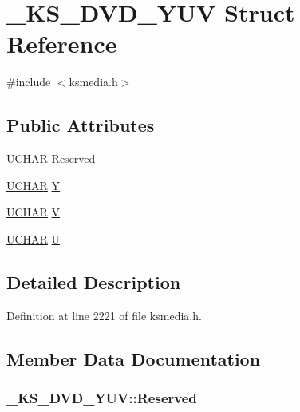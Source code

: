 \hypertarget{struct___k_s___d_v_d___y_u_v}{}\section{\+\_\+\+K\+S\+\_\+\+D\+V\+D\+\_\+\+Y\+UV Struct Reference}
\label{struct___k_s___d_v_d___y_u_v}


{\ttfamily \#include $<$ksmedia.\+h$>$}

\subsection*{Public Attributes}
\begin{DoxyCompactItemize}
\item 
\hyperlink{xlisp_8h_a9a1dc6d243c6f75bb42f87e3f69649e4}{U\+C\+H\+AR} \hyperlink{struct___k_s___d_v_d___y_u_v_ad2668a826fe951f2c968fff3d714551b}{Reserved}
\item 
\hyperlink{xlisp_8h_a9a1dc6d243c6f75bb42f87e3f69649e4}{U\+C\+H\+AR} \hyperlink{struct___k_s___d_v_d___y_u_v_a64e006d26034d45e0e8dd728c8193c58}{Y}
\item 
\hyperlink{xlisp_8h_a9a1dc6d243c6f75bb42f87e3f69649e4}{U\+C\+H\+AR} \hyperlink{struct___k_s___d_v_d___y_u_v_afe2aff1118fe00888a7b3e8ea3442caa}{V}
\item 
\hyperlink{xlisp_8h_a9a1dc6d243c6f75bb42f87e3f69649e4}{U\+C\+H\+AR} \hyperlink{struct___k_s___d_v_d___y_u_v_a8eaf7b9af2e7bbbabfbd37bd267b42bd}{U}
\end{DoxyCompactItemize}


\subsection{Detailed Description}


Definition at line 2221 of file ksmedia.\+h.



\subsection{Member Data Documentation}
\subsubsection[{\texorpdfstring{Reserved}{Reserved}}]{ \+\_\+\+K\+S\+\_\+\+D\+V\+D\+\_\+\+Y\+U\+V\+::\+Reserved}\hypertarget{struct___k_s___d_v_d___y_u_v_ad2668a826fe951f2c968fff3d714551b}{}\label{struct___k_s___d_v_d___y_u_v_ad2668a826fe951f2c968fff3d714551b}



